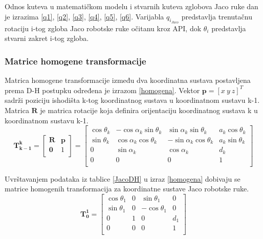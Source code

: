 \documentclass[times, utf8, diplomski, numeric]{fer}
\begin{document}
Odnos kuteva u matematičkom modelu i stvarnih kuteva zglobova Jaco ruke dan je izrazima \ref{q1}, \ref{q2}, \ref{q3}, \ref{q4}, \ref{q5}, \ref{q6}.
Varijabla $q_{i_{Jaco}}$ predstavlja trenutačnu rotaciju i-tog zgloba Jaco robotske ruke očitanu kroz API, dok $\theta_i$ predstavlja stvarni zakret i-tog zgloba.

\subsubsection{Matrice homogene transformacije}
Matrica homogene transformacije između dva koordinatna sustava postavljena prema D-H postupku određena je izrazom \ref{homogena}.
Vektor $\mathbf{p} = [x\ y\ z]^T$ sadrži poziciju ishodišta k-tog koordinatnog sustava u koordinatnom sustavu k-1.
Matrica $\mathbf{R}$ je matrica rotacije koja definira orijentaciju koordinatnog sustava k u koordinatnom sustavu k-1.
\begin{equation}
\mathbf{T_{k-1}^k} =
\begin{bmatrix} 
\mathbf{R} & \mathbf{p}\\ 
\mathbf{0} & 1\\
\end{bmatrix}
=
\begin{bmatrix} 
\cos\theta_{k}& -\cos\alpha_{k}\sin\theta_{k} & \sin\alpha_{k}\sin\theta_{k} & a_k\cos\theta_{k}\\ 
\sin\theta_{k}& \cos\alpha_{k}\cos\theta_{k} & -\sin\alpha_{k}\cos\theta_{k} & a_k\sin\theta_{k}\\
0 & \sin\alpha_{k} & \cos\alpha_{k} & d_{k}\\
0 & 0 & 0 & 1\\
\end{bmatrix}
\label{homogena}
\end{equation}

Uvrštavanjem podataka iz tablice \ref{JacoDH} u izraz \ref{homogena} dobivaju se matrice homogenih transformacija za koordinatne sustave Jaco robotske ruke.
\begin{equation}
\mathbf{T_0^1} =\begin{bmatrix} \cos\theta_{1}& 0 & \sin\theta_{1} & 0\\ 
\sin\theta_{1}& 0 & -\cos\theta_{1} & 0\\
0 & 1 & 0 & d_{1}\\
0 & 0 & 0 & 1\\
\end{bmatrix}
\end{equation}
\end{document}
